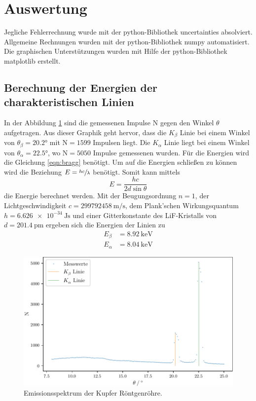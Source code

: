 \section{Auswertung}
\label{sec:Auswertung}
Jegliche Fehlerrechnung wurde mit der python-Bibliothek uncertainties \cite{uncertainties} absolviert.
Allgemeine Rechnungen wurden mit der python-Bibliothek numpy \cite{numpy} automatisiert. 
Die graphischen Unterstützungen wurden mit Hilfe der python-Bibliothek matplotlib \cite{matplotlib} erstellt.\\
\subsection{Berechnung der Energien der charakteristischen Linien} \label{sec:energy}
In der Abbildung \ref{fig:copper} sind die gemessenen Impulse N gegen den Winkel $\theta$ aufgetragen.
Aus dieser Graphik geht hervor, dass die $K_\beta$ Linie bei einem Winkel von $\theta_\beta = \ang{20.2;;}$ mit 
N$=1599$ Impulsen liegt.
Die $K_\alpha$ Linie liegt bei einem Winkel von $\theta_\alpha = \ang{22.5;;}$, wo
N$=5050$ Impulse gemessenen wurden.
Für die Energien wird die Gleichung \eqref{eqn:bragg} benötigt.
Um auf die Energien schließen zu können wird die Beziehung $E = \sfrac{hc}{\lambda}$ benötigt.
Somit kann mittels 
\begin{equation}
    E = \frac{hc}{2 d \sin \theta}
\end{equation}
die Energie berechnet werden.
Mit der Beugungsordnung $n = 1$, der Lichtgeschwindigkeit $c = \SI{299792458}{\metre\per\second}$\cite{speedoflight},
dem Plank'schen Wirkungsquantum $h = \SI{6.626e-34}{\joule\second}$\cite{plank}
und einer Gitterkonstante des LiF-Kristalls von $d=\SI{201.4}{\pico\metre}$ ergeben sich die Energien der Linien zu
\begin{align*}
    E_\beta &=\SI{8.92}{\kilo\electronvolt} \\
    E_\alpha&=\SI{8.04}{\kilo\electronvolt} 
\end{align*}
\begin{figure}
    \centering
    \caption{Emissionsspektrum der Kupfer Röntgenröhre.}
    \label{fig:copper}
    \includegraphics{build/copper.pdf}
\end{figure}
\FloatBarrier
